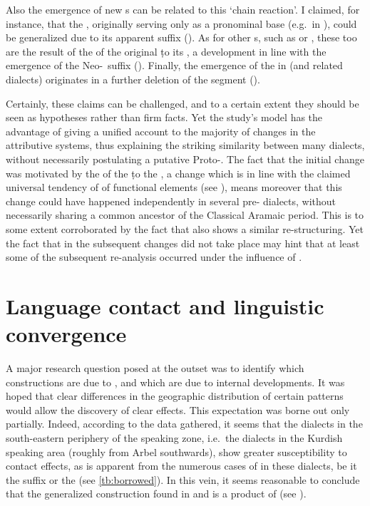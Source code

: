 Also the emergence of new \lnk*s can be related to this \enquote*{chain reaction}. I claimed, for instance, that the \lnk* {}, originally serving only as a pronominal base (e.g.\ in \JBA), could be generalized due to its apparent \cst* suffix  (). As for other \lnk*s, such as  or , these too are the result of the  of the original \lnk* \d to its \prim, a development in line with the emergence of the Neo-\cst\ suffix \ed (). Finally, the emergence of the \lnk* {} in \JUrm (and related dialects) originates in a further deletion of the   segment (). 

Certainly, these claims can be challenged, and to a certain extent they should be seen as hypotheses rather than firm facts. Yet the study's model has the advantage of giving a unified account to the majority of changes in the  attributive systems, thus explaining  the striking similarity between many  dialects, without necessarily postulating a putative Proto-. The fact that the initial change was motivated by the  of the \lnk* \d to the \prim, a change which is in line with the claimed universal tendency of  of functional elements (see ), means moreover that this change could have happened independently in several pre- dialects, without necessarily sharing a common ancestor of the Classical Aramaic period. This is to some extent corroborated by the fact that also \WNA shows a similar re-structuring. Yet the fact that in \WNA the subsequent changes did not take place  may hint that at least some of the subsequent re-analysis occurred under the influence of . 

\section{Language contact and linguistic convergence} \label{ss:lang_contact_challange}

A major research question posed at the outset was to identify which  constructions are due to , and which are due to internal developments. It was hoped that clear differences in the geographic distribution of certain patterns would allow the discovery of clear  effects. This expectation was borne out only partially. Indeed, according to the data gathered, it seems that the dialects in the south-eastern periphery of the  speaking zone, i.e.\ the dialects in the \Sor Kurdish speaking area (roughly from Arbel southwards), show greater susceptibility to contact effects, as is apparent from the numerous cases of  in these dialects, be it the \ez* suffix or the  \rel* (see \vref{tb:borrowed}). In this vein, it seems reasonable to conclude that the generalized  construction found in \JSan and \JSul is a product of  (see ). 

